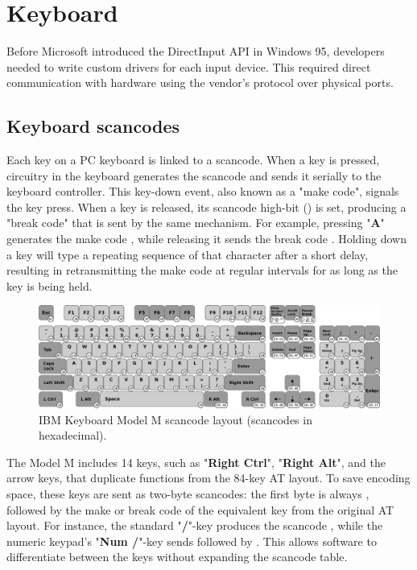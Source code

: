 \documentclass[book.tex]{subfiles}
\begin{document}
\pagebreak
\section{Keyboard}
Before Microsoft introduced the DirectInput API in Windows 95, developers needed to write custom drivers for each input device. This required direct communication with hardware using the vendor's protocol over physical ports. 


\subsection{Keyboard scancodes}
\par
Each key on a PC keyboard is linked to a scancode. When a key is pressed, circuitry in the keyboard generates the scancode and sends it serially to the keyboard controller. This key-down event, also known as a "make code", signals the key press. When a key is released, its scancode high-bit () is set, producing a "break code" that is sent by the same mechanism. For example, pressing "\textbf{A}" generates the make code , while releasing it sends the break code . Holding down a key will type a repeating sequence of that character after a short delay, resulting in retransmitting the make code at regular intervals for as long as the key is being held.\\

\begin{figure}[H]
\centering
      \includegraphics[width=1.0\textwidth]{imgs/drawings/keyboard_model_M.eps}
      \caption{IBM Keyboard Model M scancode layout (scancodes in hexadecimal).}
\end{figure}

\par
The Model M includes 14 keys, such as "\textbf{Right Ctrl}", "\textbf{Right Alt}", and the arrow keys, that duplicate functions from the 84-key AT layout. To save encoding space, these keys are sent as two-byte scancodes: the first byte is always , followed by the make or break code of the equivalent key from the original AT layout. For instance, the standard "\textbf{/}"-key produces the scancode , while the numeric keypad's "\textbf{Num /}"-key sends  followed by . This allows software to differentiate between the keys without expanding the scancode table.\\
\end{document}
